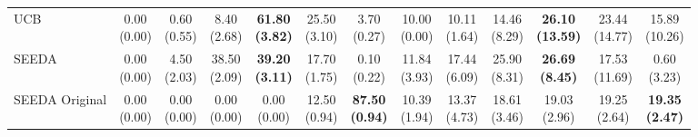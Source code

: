 \begin{table}[H]
{\begin{tabular}{l|cccccc|cccccc}
UCB & \makecell{0.00 \\ (0.00)} & \makecell{0.60 \\ (0.55)} & {\cellcolor[HTML]{C8E6C9}} \makecell{8.40 \\ (2.68)} & \bfseries \makecell{61.80 \\ (3.82)} & \makecell{25.50 \\ (3.10)} & \makecell{3.70 \\ (0.27)} & \makecell{10.00 \\ (0.00)} & \makecell{10.11 \\ (1.64)} & {\cellcolor[HTML]{C8E6C9}} \makecell{14.46 \\ (8.29)} & \bfseries \makecell{26.10 \\ (13.59)} & \makecell{23.44 \\ (14.77)} & \makecell{15.89 \\ (10.26)} \\
SEEDA & \makecell{0.00 \\ (0.00)} & \makecell{4.50 \\ (2.03)} & {\cellcolor[HTML]{C8E6C9}} \makecell{38.50 \\ (2.09)} & \bfseries \makecell{39.20 \\ (3.11)} & \makecell{17.70 \\ (1.75)} & \makecell{0.10 \\ (0.22)} & \makecell{11.84 \\ (3.93)} & \makecell{17.44 \\ (6.09)} & {\cellcolor[HTML]{C8E6C9}} \makecell{25.90 \\ (8.31)} & \bfseries \makecell{26.69 \\ (8.45)} & \makecell{17.53 \\ (11.69)} & \makecell{0.60 \\ (3.23)} \\
SEEDA Original & \makecell{0.00 \\ (0.00)} & \makecell{0.00 \\ (0.00)} & {\cellcolor[HTML]{C8E6C9}} \makecell{0.00 \\ (0.00)} & \makecell{0.00 \\ (0.00)} & \makecell{12.50 \\ (0.94)} & \bfseries \makecell{87.50 \\ (0.94)} & \makecell{10.39 \\ (1.94)} & \makecell{13.37 \\ (4.73)} & {\cellcolor[HTML]{C8E6C9}} \makecell{18.61 \\ (3.46)} & \makecell{19.03 \\ (2.96)} & \makecell{19.25 \\ (2.64)} & \bfseries \makecell{19.35 \\ (2.47)} \\

\end{tabular}}
\end{table}
